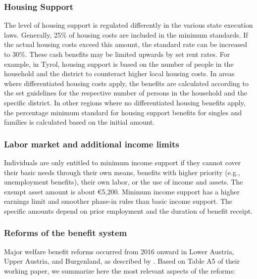 \subsubsection{Housing Support}
The level of housing support is regulated differently in the various state execution laws. Generally, 25\% of housing costs are included in the minimum standards. If the actual housing costs exceed this amount, the standard rate can be increased to 30\%. These cash benefits may be limited upwards by set rent rates. For example, in Tyrol, housing support is based on the number of people in the household and the district to counteract higher local housing costs. In areas where differentiated housing costs apply, the benefits are calculated according to the set guidelines for the respective number of persons in the household and the specific district. In other regions where no differentiated housing benefits apply, the percentage minimum standard for housing support benefits for singles and families is calculated based on the initial amount.

\subsubsection{Labor market and additional income limits}
Individuals are only entitled to minimum income support if they cannot cover their basic needs through their own means, benefits with higher priority (e.g., unemployment benefits), their own labor, or the use of income and assets. The exempt asset amount is about €5,200. Minimum income support has a higher earnings limit and smoother phase-in rules than basic income support. The specific amounts depend on prior employment and the duration of benefit receipt.

\subsubsection{Reforms of the benefit system}
Major welfare benefit reforms occurred from 2016 onward in Lower Austria, Upper Austria, and Burgenland, as described by \citet{huber_impact_2022}. Based on Table A5 of their working paper, we summarize here the most relevant aspects of the reforms:

